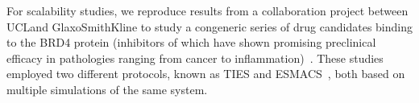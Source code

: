 








For scalability studies, we reproduce results from a collaboration project 
between UCLand GlaxoSmithKline to study a congeneric series of drug candidates binding to
the BRD4 protein (inhibitors of which have shown promising preclinical
efficacy in pathologies ranging from cancer to
inflammation)~\cite{Wan2017brd4}. These studies employed two different
protocols, known as TIES and ESMACS~\cite{Bhati2017}, both based on multiple
simulations of the same system. 


